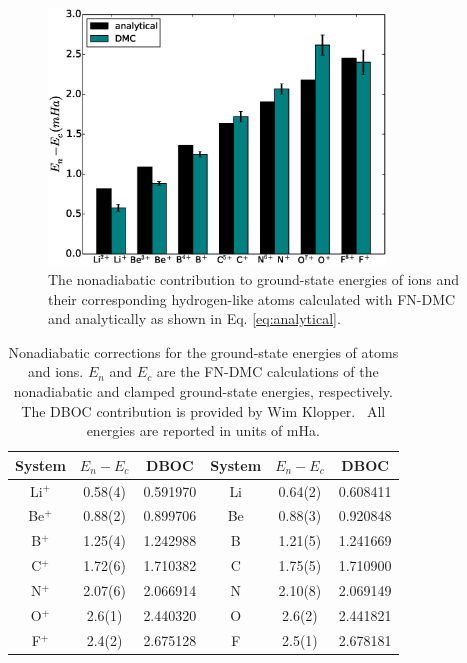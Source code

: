 \begin{figure}[h]
\centering
\includegraphics[width=0.8\textwidth]{analytical}
\caption{The nonadiabatic contribution to ground-state energies of ions and their corresponding hydrogen-like atoms calculated with FN-DMC and analytically as shown in Eq. \ref{eq:analytical}. \label{fig:analytical}}
\end{figure}

\begin{table}[h]
\centering
\setlength{\extrarowheight}{1pt}
\caption{Nonadiabatic corrections for the ground-state energies of atoms and ions. $E_n$ and $E_c$ are the FN-DMC calculations of the nonadiabatic and clamped ground-state energies, respectively. The DBOC contribution is provided by Wim Klopper.~\cite{klop1} All energies are reported in units of mHa.\label{tab:nad-ad-atoms}}
\begin{tabular}{ccc|ccc}
\hline\hline
System & $E_n-E_c$&  DBOC     & System & $E_n-E_c$&  DBOC \\ \hline
Li$^+$ &   0.58(4) &  0.591970 & Li     &   0.64(2) &  0.608411 \\
Be$^+$ &   0.88(2) &  0.899706 & Be     &   0.88(3) &  0.920848 \\
B$^+$  &   1.25(4) &  1.242988 & B      &   1.21(5) &  1.241669 \\
C$^+$  &   1.72(6) &  1.710382 & C      &   1.75(5) &  1.710900 \\
N$^+$  &   2.07(6) &  2.066914 & N      &   2.10(8) &  2.069149 \\
O$^+$  &   2.6(1) &  2.440320  & O      &   2.6(2)&  2.441821 \\
F$^+$  &   2.4(2) &  2.675128  & F      &   2.5(1)&  2.678181 \\
\hline\hline
\end{tabular}
\end{table}


